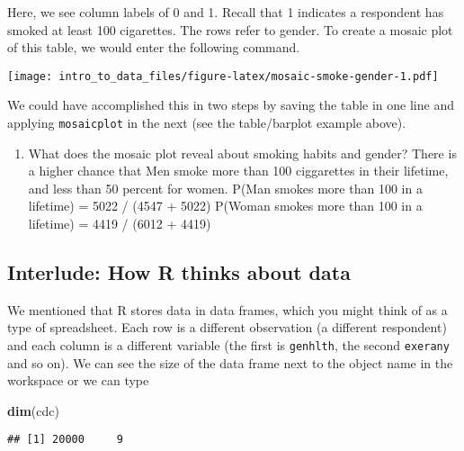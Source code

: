 \documentclass[]{article}
\newenvironment{Shaded}{\begin{snugshade}}{\end{snugshade}}
\newcommand{\KeywordTok}[1]{\textcolor[rgb]{0.13,0.29,0.53}{\textbf{#1}}}
\newcommand{\OperatorTok}[1]{\textcolor[rgb]{0.81,0.36,0.00}{\textbf{#1}}}
\newcommand{\NormalTok}[1]{#1}
\providecommand{\tightlist}{%
  \setlength{\itemsep}{0pt}\setlength{\parskip}{0pt}}
\begin{document}
Here, we see column labels of 0 and 1. Recall that 1 indicates a
respondent has smoked at least 100 cigarettes. The rows refer to gender.
To create a mosaic plot of this table, we would enter the following
command.

\begin{Shaded}
\end{Shaded}

\texttt{[image: intro\_to\_data\_files/figure-latex/mosaic-smoke-gender-1.pdf]}

We could have accomplished this in two steps by saving the table in one
line and applying \texttt{mosaicplot} in the next (see the table/barplot
example above).

\begin{enumerate}
\def\labelenumi{\arabic{enumi}.}
\setcounter{enumi}{2}
\tightlist
\item
  What does the mosaic plot reveal about smoking habits and gender?
  There is a higher chance that Men smoke more than 100 ciggarettes in
  their lifetime, and less than 50 percent for women. P(Man smokes more
  than 100 in a lifetime) = 5022 / (4547 + 5022) P(Woman smokes more
  than 100 in a lifetime) = 4419 / (6012 + 4419)
\end{enumerate}

\subsection{Interlude: How R thinks about
data}\label{interlude-how-r-thinks-about-data}

We mentioned that R stores data in data frames, which you might think of
as a type of spreadsheet. Each row is a different observation (a
different respondent) and each column is a different variable (the first
is \texttt{genhlth}, the second \texttt{exerany} and so on). We can see
the size of the data frame next to the object name in the workspace or
we can type

\begin{Shaded}
\begin{Highlighting}[]
\KeywordTok{dim}\NormalTok{(cdc)}
\end{Highlighting}
\end{Shaded}

\begin{verbatim}
## [1] 20000     9
\end{verbatim}
\end{document}
